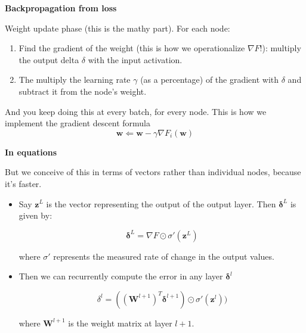 \documentclass{beamer}
\newcommand{\pagestepalt}[2]{
  \begin{frame}[t]
    \begin{minipage}[t][0.26\textheight][t]{\textwidth}
      \begin{center}
        \huge
        \textbf{#1}
      \end{center}
    \end{minipage}
    
    \begin{minipage}[t][0.7\textheight][c]{\textwidth}
      #2
    \end{minipage}
  \end{frame}
}
\begin{document}
\pagestepalt{Backpropagation from loss}{
  Weight update phase (this is the mathy part). For each node:\pause
  \begin{enumerate}
  \item Find the gradient of the weight (this is how we operationalize $\nabla F$!):
    multiply the output delta $\delta$ with the input activation.\pause
  \item The multiply the learning rate $\gamma$ (as a percentage) of
    the gradient with $\delta$ and subtract it from the node's weight.\pause
  \end{enumerate}
  And you keep doing this at every batch, for every node. This is how
  we implement the gradient descent formula\\
  \[\mathbf{w} \Leftarrow \mathbf{w} - \gamma\nabla F_i(\mathbf{w})\]
}

\pagestepalt{In equations}{
  \vspace{-1.0cm}
  But we conceive of this in terms of
  vectors rather than individual nodes, because it's faster.\pause
  \begin{itemize}
  \item  Say $\mathbf{z}^L$ is the vector representing the output of the output layer.
    Then $\mathbf{\delta}^L$ is given by:
    \begin{block}{}
      \[\mathbf{\delta}^L = \nabla F \odot \sigma'(\mathbf{z}^L)\]
    \end{block}
    where $\sigma'$ represents the measured rate of change in the output values.\pause
  \item Then we can recurrently compute the error in any layer $\mathbf{\delta}^l$
    \begin{block}{}
      \[\delta^l = ((\mathbf{W}^{l+1})^T \mathbf{\delta}^{l+1}) \odot \sigma'(\mathbf{z}^l))\]
    \end{block}
    where $\mathbf{W}^{l+1}$ is the weight matrix at layer $l+1$. 
  \end{itemize}
}
\end{document}
